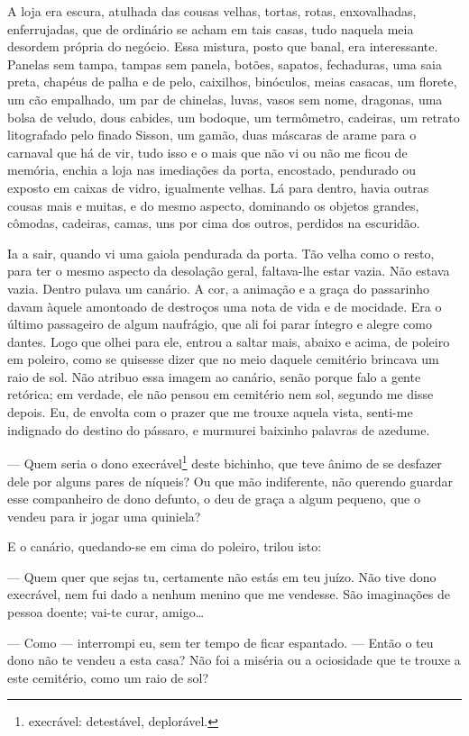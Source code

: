 A loja era escura, atulhada das cousas velhas, tortas, rotas,
enxovalhadas, enferrujadas, que de ordinário se acham em tais casas,
tudo naquela meia desordem própria do negócio. Essa mistura, posto que
banal, era interessante. Panelas sem tampa, tampas sem panela, botões,
sapatos, fechaduras, uma saia preta, chapéus de palha e de pelo,
caixilhos, binóculos, meias casacas, um florete, um cão empalhado, um
par de chinelas, luvas, vasos sem nome, dragonas, uma bolsa de veludo,
dous cabides, um bodoque, um termômetro, cadeiras, um retrato
litografado pelo finado Sisson, um gamão, duas máscaras de arame para o
carnaval que há de vir, tudo isso e o mais que não vi ou não me ficou de
memória, enchia a loja nas imediações da porta, encostado, pendurado ou
exposto em caixas de vidro, igualmente velhas. Lá para dentro, havia
outras cousas mais e muitas, e do mesmo aspecto, dominando os objetos
grandes, cômodas, cadeiras, camas, uns por cima dos outros, perdidos na
escuridão.

Ia a sair, quando vi uma gaiola pendurada da porta. Tão velha como o
resto, para ter o mesmo aspecto da desolação geral, faltava-lhe estar
vazia. Não estava vazia. Dentro pulava um canário. A cor, a animação e a
graça do passarinho davam àquele amontoado de destroços uma nota de vida
e de mocidade. Era o último passageiro de algum naufrágio, que ali foi
parar íntegro e alegre como dantes. Logo que olhei para ele, entrou a
saltar mais, abaixo e acima, de poleiro em poleiro, como se quisesse
dizer que no meio daquele cemitério brincava um raio de sol. Não atribuo
essa imagem ao canário, senão porque falo a gente retórica; em verdade,
ele não pensou em cemitério nem sol, segundo me disse depois. Eu, de
envolta com o prazer que me trouxe aquela vista, senti-me indignado do
destino do pássaro, e murmurei baixinho palavras de azedume.

--- Quem seria o dono execrável\footnote{execrável: detestável,
  deplorável.} deste bichinho, que teve ânimo de se desfazer dele por
alguns pares de níqueis? Ou que mão indiferente, não querendo guardar
esse companheiro de dono defunto, o deu de graça a algum pequeno, que o
vendeu para ir jogar uma quiniela?

E o canário, quedando-se em cima do poleiro, trilou isto:

--- Quem quer que sejas tu, certamente não estás em teu juízo. Não tive
dono execrável, nem fui dado a nenhum menino que me vendesse. São
imaginações de pessoa doente; vai-te curar, amigo\ldots{}

--- Como --- interrompi eu, sem ter tempo de ficar espantado. --- Então
o teu dono não te vendeu a esta casa? Não foi a miséria ou a ociosidade
que te trouxe a este cemitério, como um raio de sol?

